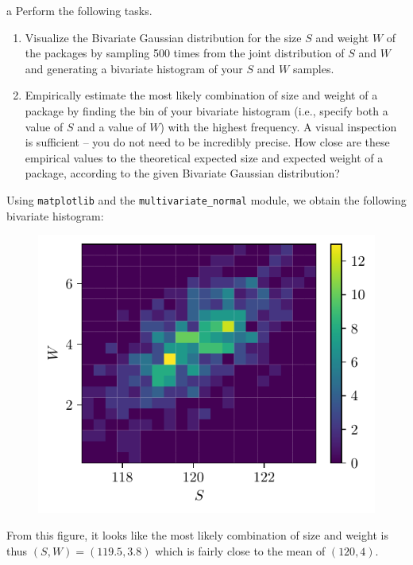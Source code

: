 \documentclass[expanded]{pset}
\begin{document}
\begin{parts}
  \begin{part}{a}
    Perform the following tasks.

    \begin{enumerate}
        \item Visualize the Bivariate Gaussian distribution for the size $S$ and weight $W$ of the packages by sampling 500 times from the joint distribution of $S$ and $W$ and generating a bivariate histogram of your $S$ and $W$ samples.
        \item Empirically estimate the most likely combination of size and weight of a package by finding the bin of your bivariate histogram (i.e., specify both a value of $S$ and a value of $W$) with the highest frequency. A visual inspection is sufficient -- you do not need to be incredibly precise.  How close are these empirical values to the theoretical expected size and expected weight of a package, according to the given Bivariate Gaussian distribution?
    \end{enumerate}
  \end{part}

  Using \texttt{matplotlib} and the \texttt{multivariate\_normal} module, we obtain the following bivariate histogram:

  \begin{figure}[ht]
    \centering
    \includegraphics[]{3a.pdf}
  \end{figure}\noindent
  From this figure, it looks like the most likely combination of size and weight is thus $(S,W)=(119.5, 3.8)$ which is fairly close to the mean of $(120, 4)$.


\end{parts}
\end{document}
